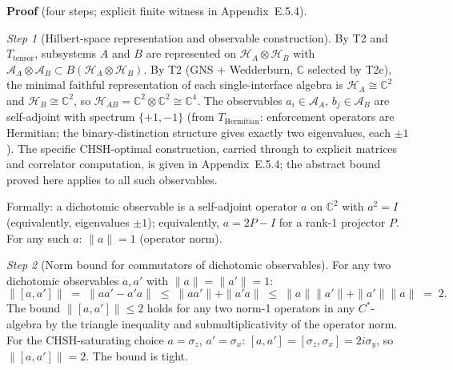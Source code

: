 \documentclass[11pt]{article}
\theoremstyle{remark}
\begin{document}
\begin{tcolorbox}[apfbox, title={$T_{\mathrm{Tsirelson}}$: CHSH Bound from Finite Enforcement Capacity}]
\smallskip\noindent\textbf{Proof} (four steps; explicit finite witness in Appendix~E.5.4).

\textit{Step 1} (Hilbert-space representation and observable construction).  By T2 and $T_{\mathrm{tensor}}$, subsystems $A$ and $B$ are represented on $\mathcal{H}_A \otimes \mathcal{H}_B$ with $\mathcal{A}_A \otimes \mathcal{A}_B \subset B(\mathcal{H}_A \otimes \mathcal{H}_B)$.  By T2 (GNS + Wedderburn, $\mathbb{C}$ selected by T2c), the minimal faithful representation of each single-interface algebra is $\mathcal{H}_A \cong \mathbb{C}^2$ and $\mathcal{H}_B \cong \mathbb{C}^2$, so $\mathcal{H}_{AB} = \mathbb{C}^2 \otimes \mathbb{C}^2 \cong \mathbb{C}^4$.  The observables $a_i \in \mathcal{A}_A$, $b_j \in \mathcal{A}_B$ are self-adjoint with spectrum $\{+1,-1\}$ (from $T_{\mathrm{Hermitian}}$: enforcement operators are Hermitian; the binary-distinction structure gives exactly two eigenvalues, each $\pm 1$).  The specific CHSH-optimal construction, carried through to explicit matrices and correlator computation, is given in Appendix~E.5.4; the abstract bound proved here applies to all such observables.

Formally: a dichotomic observable is a self-adjoint operator $a$ on $\mathbb{C}^2$ with $a^2 = I$ (equivalently, eigenvalues $\pm 1$); equivalently, $a = 2P - I$ for a rank-1 projector $P$.  For any such $a$: $\|a\| = 1$ (operator norm).

\textit{Step 2} (Norm bound for commutators of dichotomic observables).  For any two dichotomic observables $a, a'$ with $\|a\| = \|a'\| = 1$:
\[
\|[a, a']\| \;=\; \|aa' - a'a\| \;\le\; \|aa'\| + \|a'a\| \;\le\; \|a\|\|a'\| + \|a'\|\|a\| \;=\; 2.
\]
The bound $\|[a,a']\| \le 2$ holds for any two norm-1 operators in any $C^*$-algebra by the triangle inequality and submultiplicativity of the operator norm.  For the CHSH-saturating choice $a = \sigma_z$, $a' = \sigma_x$: $[a,a'] = [\sigma_z,\sigma_x] = 2i\sigma_y$, so $\|[a,a']\| = 2$.  The bound is tight.


\end{tcolorbox}
\end{document}
